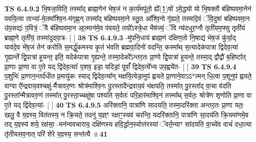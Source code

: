 \documentclass[17pt]{extarticle}
\begin{document}
                  \newline
                                \textbf{ TS 6.4.9.2} \newline
                  भि॒षजा॒विति॒ तस्मा᳚द् ब्राह्म॒णेन॑ भेष॒जं न का॒र्य॑मपू॑तो॒ ह्ये᳚(1॒)षो॑ ऽमे॒द्ध्यो यो भि॒षक्तौ ब॑हिष्पवमा॒नेन॑ पवयि॒त्वा ताभ्या॑-मे॒तमा᳚श्वि॒न-म॑गृह्ण॒न् तस्मा᳚द् बहिष्पवमा॒ने स्तु॒त आ᳚श्वि॒नो गृ॑ह्यते॒ तस्मा॑दे॒वं ॅवि॒दुषा॑ बहिष्पवमा॒न उ॑प॒सद्यः॑ प॒वित्रं॒ ॅवै ब॑हिष्पवमा॒न आ॒त्मान॑मे॒व प॑वयते॒ तयो᳚ऽस्त्रे॒धा भैष॑ज्यं॒ ॅवि न्य॑दधुर॒ग्नौ तृती॑यम॒फ्सु तृती॑यं ब्राह्म॒णे तृती॑यं॒ तस्मा॑दुदपा॒त्र- [  ] \textbf{  38} \newline
                  \newline
                                \textbf{ TS 6.4.9.3} \newline
                  -मु॑पनि॒धाय॑ ब्राह्म॒णं द॑क्षिण॒तो नि॒षाद्य॑ भेष॒जं कु॑र्या॒द् याव॑दे॒व भे॑ष॒जं तेन॑ करोति स॒मर्द्धु॑कमस्य कृ॒तं भ॑वति ब्रह्मवा॒दिनो॑ वदन्ति॒  कस्मा᳚थ् स॒त्यादेक॑पात्रा द्विदेव॒त्या॑ गृ॒ह्यन्ते᳚ द्वि॒पात्रा॑ हूयन्त॒ इति॒ यदेक॑पात्रा गृ॒ह्यन्ते॒ तस्मा॒देको᳚ऽन्तर॒तः प्रा॒णो द्वि॒पात्रा॑ हूयन्ते॒ तस्मा॒द् द्वौद्वौ॑ ब॒हिष्टा᳚त् प्रा॒णाः प्रा॒णा वा ए॒ते यद् द्वि॑देव॒त्याः᳚ प॒शव॒ इडा॒ यदिडां॒ पूर्वां᳚ द्विदेव॒त्ये᳚भ्य उप॒ह्वये॑त- [  ] \textbf{  39} \newline
                  \newline
                                \textbf{ TS 6.4.9.4} \newline
                  प॒शुभिः॑ प्रा॒णान॒न्तर्द॑धीत प्र॒मायु॑कः स्याद् द्विदेव॒त्या᳚न् भक्षयि॒त्वेडा॒मुप॑ ह्वयते प्रा॒णाने॒वाऽऽ*त्मन् धि॒त्वा प॒शूनुप॑ ह्वयते॒ वाग्वा ऐ᳚न्द्रवाय॒वश्चक्षु॑-र्मैत्रावरु॒णः श्रोत्र॑माश्वि॒नः पु॒रस्ता॑दैन्द्रवाय॒वं भ॑क्षयति॒ तस्मा᳚त् पु॒रस्ता᳚द् वा॒चा व॑दति पु॒रस्ता᳚न्मैत्रावरु॒णं तस्मा᳚त् पु॒रस्ता॒च्चक्षु॑षा पश्यति स॒र्वतः॑ परि॒हार॑माश्वि॒नं तस्मा᳚थ् स॒र्वतः॒ श्रोत्रे॑ण शृणोति प्रा॒णा वा ए॒ते यद् द्वि॑देव॒त्या॑- [  ] \textbf{  40} \newline
                  \newline
                                \textbf{ TS 6.4.9.5} \newline
                  अरि॑क्तानि॒ पात्रा॑णि सादयति॒ तस्मा॒दरि॑क्ता अन्तर॒तः प्रा॒णा यतः॒ खलु॒ वै य॒ज्ञ्स्य॒ वित॑तस्य॒ न क्रि॒यते॒ तदनु॑ य॒ज्ञ्ꣳ रक्षाꣳ॒॒स्यव॑ चरन्ति॒ यदरि॑क्तानि॒ पात्रा॑णि सा॒दय॑ति क्रि॒यमा॑णमे॒व तद् य॒ज्ञ्स्य॑ शये॒ रक्ष॑सा॒ -मन॑न्ववचाराय॒ दक्षि॑णस्य हवि॒र्द्धान॒स्योत्त॑रस्यां ॅवर्त॒न्याꣳ सा॑दयति वा॒च्ये॑व वाचं॑ दधा॒त्या तृ॑तीयसव॒नात् परि॑ शेरे य॒ज्ञ्स्य॒ सन्त॑त्यै ॥ \textbf{  41} \newline
\end{document}
